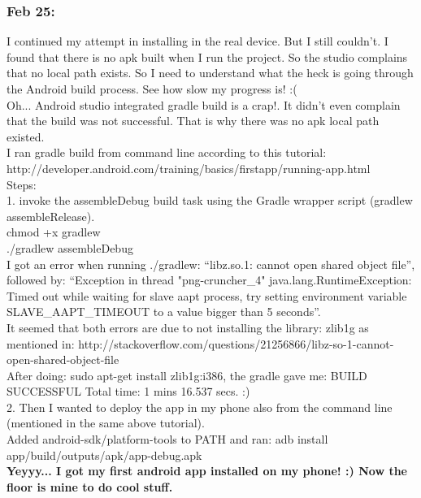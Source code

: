 \documentclass[11pt]{article}
\begin{document}
\subsubsection*{Feb 25:}
I continued my attempt in installing in the real device. But I still couldn't.
I found that there is no apk built when I run the project. So the studio complains that no local path exists. So I need to understand what the heck 
is going through the Android build process. See how slow my progress is! :(\\

Oh... Android studio integrated gradle build is a crap!. It didn't even complain that the build was not successful. That is why there was no apk 
local path existed.\\

I ran gradle build from command line according to this tutorial: \\
http://developer.android.com/training/basics/firstapp/running-app.html\\

Steps:\\
1. invoke the assembleDebug build task using the Gradle wrapper script (gradlew assembleRelease).\\
chmod +x gradlew\\
./gradlew assembleDebug\\

I got an error when running ./gradlew: ``libz.so.1: cannot open shared object file'', followed by: ``Exception in thread "png-cruncher\_4" 
java.lang.RuntimeException: Timed out while waiting for slave aapt process, try setting environment variable SLAVE\_AAPT\_TIMEOUT to a value bigger 
than 5 seconds''.\\
It seemed that both errors are due to not installing the library: zlib1g as mentioned in: 
http://stackoverflow.com/questions/21256866/libz-so-1-cannot-open-shared-object-file\\
After doing: sudo apt-get install zlib1g:i386, the gradle gave me: BUILD SUCCESSFUL Total time: 1 mins 16.537 secs. :)\\

2. Then I wanted to deploy the app in my phone also from the command line (mentioned in the same above tutorial).\\
Added android-sdk/platform-tools to PATH and ran: adb install app/build/outputs/apk/app-debug.apk\\
\textbf{Yeyyy... I got my first android app installed on my phone! :) Now the floor is mine to do cool stuff.}\\
\end{document}
